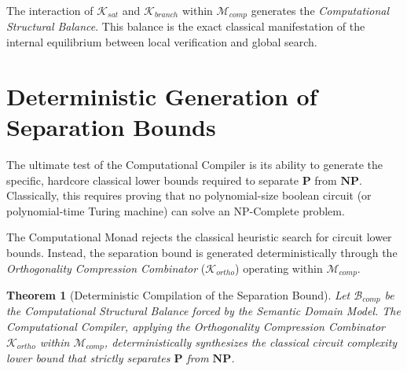 \documentclass[12pt,openany]{extbook}
\theoremstyle{plain}
\newtheorem{theorem}{Theorem}[chapter]
\theoremstyle{definition}
\begin{document}
The interaction of $\mathcal{K}_{sat}$ and $\mathcal{K}_{branch}$ within $\mathcal{M}_{comp}$ generates the \emph{Computational Structural Balance}. This balance is the exact classical manifestation of the internal equilibrium between local verification and global search.

\section{Deterministic Generation of Separation Bounds}

The ultimate test of the Computational Compiler is its ability to generate the specific, hardcore classical lower bounds required to separate $\mathbf{P}$ from $\mathbf{NP}$. Classically, this requires proving that no polynomial-size boolean circuit (or polynomial-time Turing machine) can solve an NP-Complete problem. 

The Computational Monad rejects the classical heuristic search for circuit lower bounds. Instead, the separation bound is generated deterministically through the \emph{Orthogonality Compression Combinator} ($\mathcal{K}_{ortho}$) operating within $\mathcal{M}_{comp}$.

\begin{theorem}[Deterministic Compilation of the Separation Bound]
Let $\mathcal{B}_{comp}$ be the Computational Structural Balance forced by the Semantic Domain Model. The Computational Compiler, applying the Orthogonality Compression Combinator $\mathcal{K}_{ortho}$ within $\mathcal{M}_{comp}$, deterministically synthesizes the classical circuit complexity lower bound that strictly separates $\mathbf{P}$ from $\mathbf{NP}$.
\end{theorem}
\end{document}
